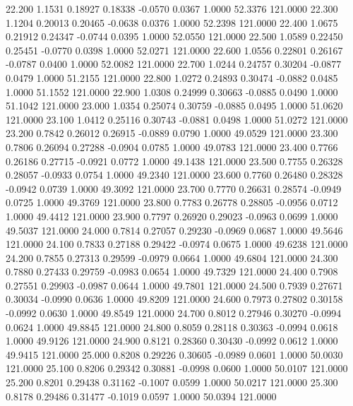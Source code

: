   22.200   1.1531   0.18927   0.18338  -0.0570   0.0367   1.0000  52.3376 121.0000
  22.300   1.1204   0.20013   0.20465  -0.0638   0.0376   1.0000  52.2398 121.0000
  22.400   1.0675   0.21912   0.24347  -0.0744   0.0395   1.0000  52.0550 121.0000
  22.500   1.0589   0.22450   0.25451  -0.0770   0.0398   1.0000  52.0271 121.0000
  22.600   1.0556   0.22801   0.26167  -0.0787   0.0400   1.0000  52.0082 121.0000
  22.700   1.0244   0.24757   0.30204  -0.0877   0.0479   1.0000  51.2155 121.0000
  22.800   1.0272   0.24893   0.30474  -0.0882   0.0485   1.0000  51.1552 121.0000
  22.900   1.0308   0.24999   0.30663  -0.0885   0.0490   1.0000  51.1042 121.0000
  23.000   1.0354   0.25074   0.30759  -0.0885   0.0495   1.0000  51.0620 121.0000
  23.100   1.0412   0.25116   0.30743  -0.0881   0.0498   1.0000  51.0272 121.0000
  23.200   0.7842   0.26012   0.26915  -0.0889   0.0790   1.0000  49.0529 121.0000
  23.300   0.7806   0.26094   0.27288  -0.0904   0.0785   1.0000  49.0783 121.0000
  23.400   0.7766   0.26186   0.27715  -0.0921   0.0772   1.0000  49.1438 121.0000
  23.500   0.7755   0.26328   0.28057  -0.0933   0.0754   1.0000  49.2340 121.0000
  23.600   0.7760   0.26480   0.28328  -0.0942   0.0739   1.0000  49.3092 121.0000
  23.700   0.7770   0.26631   0.28574  -0.0949   0.0725   1.0000  49.3769 121.0000
  23.800   0.7783   0.26778   0.28805  -0.0956   0.0712   1.0000  49.4412 121.0000
  23.900   0.7797   0.26920   0.29023  -0.0963   0.0699   1.0000  49.5037 121.0000
  24.000   0.7814   0.27057   0.29230  -0.0969   0.0687   1.0000  49.5646 121.0000
  24.100   0.7833   0.27188   0.29422  -0.0974   0.0675   1.0000  49.6238 121.0000
  24.200   0.7855   0.27313   0.29599  -0.0979   0.0664   1.0000  49.6804 121.0000
  24.300   0.7880   0.27433   0.29759  -0.0983   0.0654   1.0000  49.7329 121.0000
  24.400   0.7908   0.27551   0.29903  -0.0987   0.0644   1.0000  49.7801 121.0000
  24.500   0.7939   0.27671   0.30034  -0.0990   0.0636   1.0000  49.8209 121.0000
  24.600   0.7973   0.27802   0.30158  -0.0992   0.0630   1.0000  49.8549 121.0000
  24.700   0.8012   0.27946   0.30270  -0.0994   0.0624   1.0000  49.8845 121.0000
  24.800   0.8059   0.28118   0.30363  -0.0994   0.0618   1.0000  49.9126 121.0000
  24.900   0.8121   0.28360   0.30430  -0.0992   0.0612   1.0000  49.9415 121.0000
  25.000   0.8208   0.29226   0.30605  -0.0989   0.0601   1.0000  50.0030 121.0000
  25.100   0.8206   0.29342   0.30881  -0.0998   0.0600   1.0000  50.0107 121.0000
  25.200   0.8201   0.29438   0.31162  -0.1007   0.0599   1.0000  50.0217 121.0000
  25.300   0.8178   0.29486   0.31477  -0.1019   0.0597   1.0000  50.0394 121.0000
